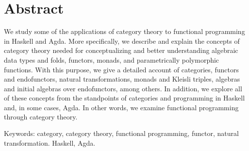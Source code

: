 \chapter{Abstract}
\label{chap:abstract}

We study some of the applications of category theory to functional
programming in Haskell and Agda. More specifically, we describe and
explain the concepts of category theory needed for conceptualizing and
better understanding algebraic data types and folds, functors, monads,
and parametrically polymorphic functions. With this purpose, we give a
detailed account of categories, functors and endofunctors, natural
transformations, monads and Kleisli triples, algebras and initial
algebras over endofunctors, among others. In addition, we explore all
of these concepts from the standpoints of categories and programming
in Haskell and, in some cases, Agda. In other words, we examine
functional programming through category theory.


\vspace{1em}
\noindent
Keywords: category, category theory, functional programming, functor,
natural transformation. Haskell, Agda.

\clearemptydoublepage
